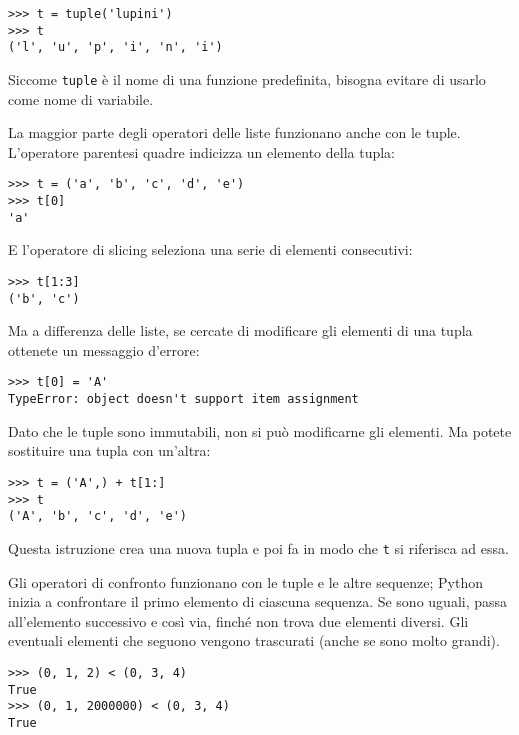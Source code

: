 \documentclass[10pt]{book}
\begin{document}
\begin{verbatim}
>>> t = tuple('lupini')
>>> t
('l', 'u', 'p', 'i', 'n', 'i')
\end{verbatim}
%
Siccome {\tt tuple} è il nome di una funzione predefinita, bisogna evitare di usarlo come nome di variabile.

La maggior parte degli operatori delle liste funzionano anche con le tuple. L'operatore parentesi quadre indicizza un elemento della tupla:

\begin{verbatim}
>>> t = ('a', 'b', 'c', 'd', 'e')
>>> t[0]
'a'
\end{verbatim}
%
E l'operatore di slicing seleziona una serie di elementi consecutivi:

\begin{verbatim}
>>> t[1:3]
('b', 'c')
\end{verbatim}
%
Ma a differenza delle liste, se cercate di modificare gli elementi di una tupla ottenete un messaggio d'errore:

\begin{verbatim}
>>> t[0] = 'A'
TypeError: object doesn't support item assignment
\end{verbatim}
%
Dato che le tuple sono immutabili, non si può modificarne gli elementi. Ma potete sostituire una tupla con un'altra:

\begin{verbatim}
>>> t = ('A',) + t[1:]
>>> t
('A', 'b', 'c', 'd', 'e')
\end{verbatim}
%

Questa istruzione crea una nuova tupla e poi fa in modo che {\tt t} si riferisca ad essa.

Gli operatori di confronto funzionano con le tuple e le altre sequenze; Python inizia a confrontare il primo elemento di ciascuna sequenza. Se sono uguali, passa all'elemento successivo e così via, finché non trova due elementi diversi. Gli eventuali elementi che seguono vengono trascurati (anche se sono molto grandi).

\begin{verbatim}
>>> (0, 1, 2) < (0, 3, 4)
True
>>> (0, 1, 2000000) < (0, 3, 4)
True
\end{verbatim}
%
\end{document}
